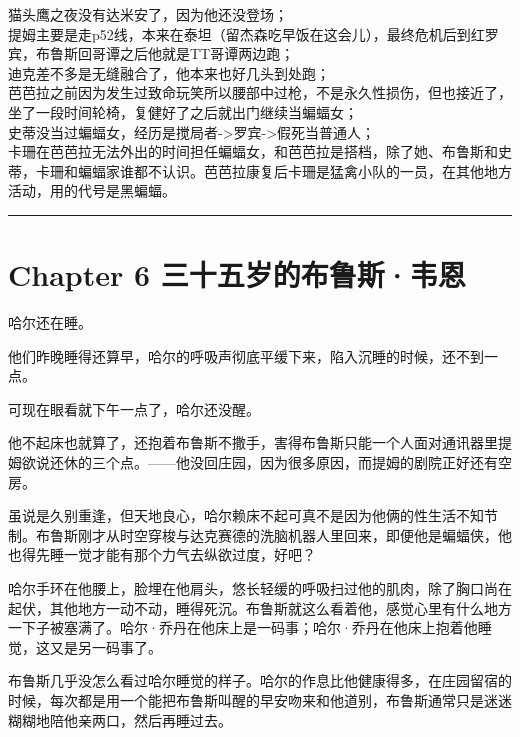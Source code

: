 \documentclass[../main]{subfiles}
\begin{document}
\begin{itemize}
          猫头鹰之夜没有达米安了，因为他还没登场；\\
          提姆主要是走p52线，本来在泰坦（留杰森吃早饭在这会儿），最终危机后到红罗宾，布鲁斯回哥谭之后他就是TT哥谭两边跑；\\
          迪克差不多是无缝融合了，他本来也好几头到处跑；\\
          芭芭拉之前因为发生过致命玩笑所以腰部中过枪，不是永久性损伤，但也接近了，坐了一段时间轮椅，复健好了之后就出门继续当蝙蝠女；\\
          史蒂没当过蝙蝠女，经历是搅局者-\textgreater 罗宾-\textgreater 假死当普通人；\\
          卡珊在芭芭拉无法外出的时间担任蝙蝠女，和芭芭拉是搭档，除了她、布鲁斯和史蒂，卡珊和蝙蝠家谁都不认识。芭芭拉康复后卡珊是猛禽小队的一员，在其他地方活动，用的代号是黑蝙蝠。
\end{itemize}

\begin{center}\rule{0.5\linewidth}{0.5pt}\end{center}

\hypertarget{chapter-6-ux4e09ux5341ux4e94ux5c81ux7684ux5e03ux9c81ux65afuxb7ux97e6ux6069}{%
    \section{Chapter 6
      三十五岁的布鲁斯·韦恩}\label{chapter-6-ux4e09ux5341ux4e94ux5c81ux7684ux5e03ux9c81ux65afuxb7ux97e6ux6069}}

哈尔还在睡。

他们昨晚睡得还算早，哈尔的呼吸声彻底平缓下来，陷入沉睡的时候，还不到一点。

可现在眼看就下午一点了，哈尔还没醒。

他不起床也就算了，还抱着布鲁斯不撒手，害得布鲁斯只能一个人面对通讯器里提姆欲说还休的三个点。——他没回庄园，因为很多原因，而提姆的剧院正好还有空房。

虽说是久别重逢，但天地良心，哈尔赖床不起可真不是因为他俩的性生活不知节制。布鲁斯刚才从时空穿梭与达克赛德的洗脑机器人里回来，即便他是蝙蝠侠，他也得先睡一觉才能有那个力气去纵欲过度，好吧？

哈尔手环在他腰上，脸埋在他肩头，悠长轻缓的呼吸扫过他的肌肉，除了胸口尚在起伏，其他地方一动不动，睡得死沉。布鲁斯就这么看着他，感觉心里有什么地方一下子被塞满了。哈尔·乔丹在他床上是一码事；哈尔·乔丹在他床上抱着他睡觉，这又是另一码事了。

布鲁斯几乎没怎么看过哈尔睡觉的样子。哈尔的作息比他健康得多，在庄园留宿的时候，每次都是用一个能把布鲁斯叫醒的早安吻来和他道别，布鲁斯通常只是迷迷糊糊地陪他亲两口，然后再睡过去。
\end{document}
